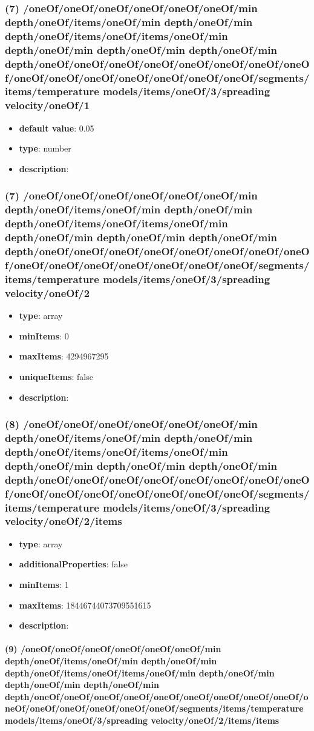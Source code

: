 \subsubsection{(7) /oneOf/oneOf/oneOf/oneOf/oneOf/oneOf/min depth/oneOf/items/oneOf/min depth/oneOf/min depth/oneOf/items/oneOf/items/oneOf/min depth/oneOf/min depth/oneOf/min depth/oneOf/min depth/oneOf/oneOf/oneOf/oneOf/oneOf/oneOf/oneOf/oneOf/oneOf/oneOf/oneOf/oneOf/oneOf/oneOf/oneOf/segments/items/temperature models/items/oneOf/3/spreading velocity/oneOf/1}
\begin{itemize}[leftmargin=7em]\item {\bf default value}: 0.05
\item {\bf type}: number
\item {\bf description}: 
\end{itemize}\subsubsection{(7) /oneOf/oneOf/oneOf/oneOf/oneOf/oneOf/min depth/oneOf/items/oneOf/min depth/oneOf/min depth/oneOf/items/oneOf/items/oneOf/min depth/oneOf/min depth/oneOf/min depth/oneOf/min depth/oneOf/oneOf/oneOf/oneOf/oneOf/oneOf/oneOf/oneOf/oneOf/oneOf/oneOf/oneOf/oneOf/oneOf/oneOf/segments/items/temperature models/items/oneOf/3/spreading velocity/oneOf/2}
\begin{itemize}[leftmargin=7em]\item {\bf type}: array
\item {\bf minItems}: 0
\item {\bf maxItems}: 4294967295
\item {\bf uniqueItems}: false
\item {\bf description}: 
\end{itemize}\subsubsection{(8) /oneOf/oneOf/oneOf/oneOf/oneOf/oneOf/min depth/oneOf/items/oneOf/min depth/oneOf/min depth/oneOf/items/oneOf/items/oneOf/min depth/oneOf/min depth/oneOf/min depth/oneOf/min depth/oneOf/oneOf/oneOf/oneOf/oneOf/oneOf/oneOf/oneOf/oneOf/oneOf/oneOf/oneOf/oneOf/oneOf/oneOf/segments/items/temperature models/items/oneOf/3/spreading velocity/oneOf/2/items}
\begin{itemize}[leftmargin=8em]\item {\bf type}: array
\item {\bf additionalProperties}: false
\item {\bf minItems}: 1
\item {\bf maxItems}: 18446744073709551615
\item {\bf description}: 
\end{itemize}\paragraph{(9) /oneOf/oneOf/oneOf/oneOf/oneOf/oneOf/min depth/oneOf/items/oneOf/min depth/oneOf/min depth/oneOf/items/oneOf/items/oneOf/min depth/oneOf/min depth/oneOf/min depth/oneOf/min depth/oneOf/oneOf/oneOf/oneOf/oneOf/oneOf/oneOf/oneOf/oneOf/oneOf/oneOf/oneOf/oneOf/oneOf/oneOf/segments/items/temperature models/items/oneOf/3/spreading velocity/oneOf/2/items/items}
